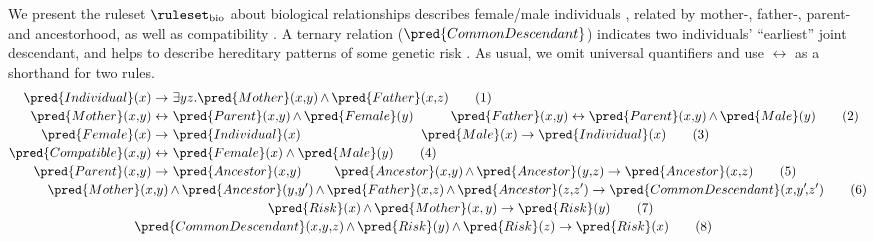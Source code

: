 \begin{example}\label{ex:Rbio}
We present the ruleset $\ruleset_\mathrm{bio}$ about biological relationships describes female/male individuals%
, related by mother-, father-, parent- and ancestorhood, as well as compatibility%
. A ternary relation ($\pred{CommonDescendant}$) indicates two individuals' ``earliest'' joint descendant, and helps to describe hereditary patterns of some genetic risk%
. As usual, we omit universal quantifiers and use $\leftrightarrow$ as a shorthand for two rules.
{\small
	\begin{align}
		\pred{Individual}(x) \to & \ \exists yz.\pred{Mother}(x,\!y) {\,\wedge\,} \pred{Father}(x,\!z) \tag{1}\\[-1pt]
		\pred{Mother}(x,\!y) \leftrightarrow & \ \pred{Parent}(x,\!y) {\,\wedge\,} \pred{Female}(y) \ \  \hspace{5ex} \pred{Father}(x,\!y) \leftrightarrow \pred{Parent}(x,\!y) {\,\wedge\,} \pred{Male}(y) \tag{2}\\[-1pt]
		\pred{Female}(x) \to  & \ \pred{Individual}(x) \hspace{21.3ex}  \pred{Male}(x) \to  \pred{Individual}(x) \tag{3}\\[-1pt]
		\pred{Compatible}(x,\!y) \leftrightarrow & \ \pred{Female}(x) \wedge \pred{Male}(y)   \tag{4}\\[-1pt]
		\pred{Parent}(x,\!y) \to & \ \pred{Ancestor}(x,\!y) \hspace{5.8ex} \pred{Ancestor}(x,\!y) {\,\wedge\,} \pred{Ancestor}(y,\!z) \to \pred{Ancestor}(x,\!z) \tag{5}\\[-1pt]
		& \!\hspace{-21ex} \pred{Mother}(x,\!y) {\,\wedge\,} \pred{Ancestor}(y,\!y') {\,\wedge\,} \pred{Father}(x,\!z) {\,\wedge\,} \pred{Ancestor}(z,\!z') \to \pred{CommonDescendant}(x,\!y'\!,\!z') \tag{6}\\[-1pt]
		& \!\hspace{18ex}  \pred{Risk}(x) {\,\wedge\,} \pred{Mother}(x,y) \to \pred{Risk}(y) \tag{7}\\[-1pt]
		& \hspace{-6ex} \pred{CommonDescendant}(x,\!y,\!z) {\,\wedge\,} \pred{Risk}(y) {\,\wedge\,} \pred{Risk}(z) \to \pred{Risk}(x) \tag{8}
	\end{align}}
\vspace{-4ex}
\end{example}

